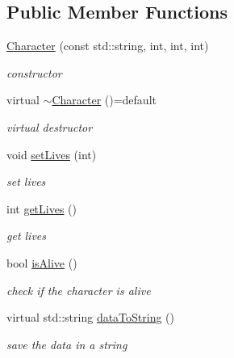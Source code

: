 \subsection*{Public Member Functions}
\begin{DoxyCompactItemize}
\item 
\mbox{\label{class_character_a83f1f8a2eb47e7a891ef14e673703e15}} 
\mbox{\hyperlink{class_character_a83f1f8a2eb47e7a891ef14e673703e15}{Character}} (const std\+::string, int, int, int)
\begin{DoxyCompactList}\small\item\em constructor \end{DoxyCompactList}\item 
\mbox{\label{class_character_a3333a88ae593c36b229c90371e935d42}} 
virtual \mbox{\hyperlink{class_character_a3333a88ae593c36b229c90371e935d42}{$\sim$\+Character}} ()=default
\begin{DoxyCompactList}\small\item\em virtual destructor \end{DoxyCompactList}\item 
\mbox{\label{class_character_a5c979ca4dd41c717ff7f6a620c67c0ff}} 
void \mbox{\hyperlink{class_character_a5c979ca4dd41c717ff7f6a620c67c0ff}{set\+Lives}} (int)
\begin{DoxyCompactList}\small\item\em set lives \end{DoxyCompactList}\item 
\mbox{\label{class_character_a95b485165df76e581b04cda3391e43ab}} 
int \mbox{\hyperlink{class_character_a95b485165df76e581b04cda3391e43ab}{get\+Lives}} ()
\begin{DoxyCompactList}\small\item\em get lives \end{DoxyCompactList}\item 
\mbox{\label{class_character_aa49f985b1b05751b2d4b3de74b4acc8c}} 
bool \mbox{\hyperlink{class_character_aa49f985b1b05751b2d4b3de74b4acc8c}{is\+Alive}} ()
\begin{DoxyCompactList}\small\item\em check if the character is alive \end{DoxyCompactList}\item 
\mbox{\label{class_character_ad0d14b85124c5d0da611b2b925968277}} 
virtual std\+::string \mbox{\hyperlink{class_character_ad0d14b85124c5d0da611b2b925968277}{data\+To\+String}} ()
\begin{DoxyCompactList}\small\item\em save the data in a string \end{DoxyCompactList}\end{DoxyCompactItemize}


